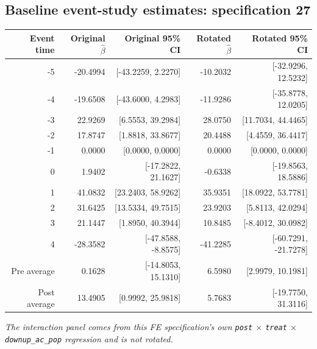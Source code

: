 \documentclass[10pt]{article}
\begin{document}
\subsection*{Baseline event-study estimates: specification 27}
\begin{center}
\scriptsize
\begin{tabular}{r rr rr}
\toprule
Event time & Original $\hat\beta$ & Original 95\% CI & Rotated $\hat\beta$ & Rotated 95\% CI \\
\midrule
-5 & -20.4994 & [-43.2259, 2.2270] & -10.2032 & [-32.9296, 12.5232] \\
-4 & -19.6508 & [-43.6000, 4.2983] & -11.9286 & [-35.8778, 12.0205] \\
-3 & 22.9269 & [6.5553, 39.2984] & 28.0750 & [11.7034, 44.4465] \\
-2 & 17.8747 & [1.8818, 33.8677] & 20.4488 & [4.4559, 36.4417] \\
-1 & 0.0000 & [0.0000, 0.0000] & 0.0000 & [0.0000, 0.0000] \\
0 & 1.9402 & [-17.2822, 21.1627] & -0.6338 & [-19.8563, 18.5886] \\
1 & 41.0832 & [23.2403, 58.9262] & 35.9351 & [18.0922, 53.7781] \\
2 & 31.6425 & [13.5334, 49.7515] & 23.9203 & [5.8113, 42.0294] \\
3 & 21.1447 & [1.8950, 40.3944] & 10.8485 & [-8.4012, 30.0982] \\
4 & -28.3582 & [-47.8588, -8.8575] & -41.2285 & [-60.7291, -21.7278] \\
\midrule
Pre average & 0.1628 & [-14.8053, 15.1310] & 6.5980 & [2.9979, 10.1981] \\
Post average & 13.4905 & [0.9992, 25.9818] & 5.7683 & [-19.7750, 31.3116] \\
\bottomrule
\end{tabular}
\end{center}
\medskip
\textit{The interaction panel comes from this FE specification's own \texttt{post} $\times$ \texttt{treat} $\times$ \texttt{downup\_ac\_pop} regression and is not rotated.}
\clearpage
\end{document}
